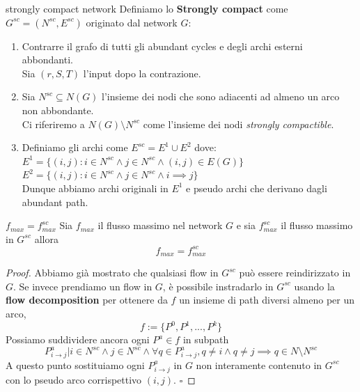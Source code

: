 \documentclass[a4paper, 11pt]{report}
\newcommand*{\QED}{\null\nobreak\hfill\ensuremath{\square}}%
\begin{document}
\begin{algo}{strongly compact network}{}
    Definiamo lo \textbf{Strongly compact} come $G^{sc} =(N^{sc}, E^{sc})$ originato dal network $G$:
    \begin{enumerate}
        \item Contrarre il grafo di tutti gli abundant cycles e degli archi esterni abbondanti.\\
        Sia $(r,S,T)$ l'input dopo la contrazione.
        \item Sia $N^{sc}\subseteq N(G)$ l'insieme dei nodi che sono adiacenti ad almeno un arco non abbondante.\\
        Ci riferiremo a $N(G)\setminus N^{sc}$ come l'insieme dei nodi \textit{strongly compactible}.
        \item Definiamo gli archi come $E^{sc} = E^1 \cup E^2$ dove:\\
        $E^1 = \{(i,j): i\in N^{sc}\land j\in N^{sc}\land (i,j)\in E(G)\}$\\
        $E^2 = \{(i,j): i\in N^{sc}\land j\in N^{sc}\land i\implies j\}$\\
        Dunque abbiamo archi originali in $E^1$ e pseudo archi che derivano dagli abundant path.
        
    \end{enumerate}
    
\end{algo}
   \begin{theo}[label = fmaxfsc]{$f_{max} = f_{max}^{sc}$}{}
    Sia $f_{max}$ il flusso massimo nel network $G$ e sia $f_{max}^{sc}$ il flusso massimo in $G^{sc}$ allora 
    \[f_{max} = f_{max}^{sc}\]
\end{theo}
\begin{proof}
    Abbiamo già mostrato che qualsiasi flow in $G^{sc}$ può essere reindirizzato in $G$.
    Se invece prendiamo un flow in $G$, è possibile instradarlo in $G^{sc}$ usando la \textbf{flow decomposition} per ottenere da $f$ un insieme di path diversi almeno per un arco,
    \[f := \{P^0, P^1, ..., P^k\}\]
    Possiamo suddividere ancora ogni $P^a\in f$ in subpath \[P^{a}_{i\rightarrow j}| i\in N^{sc}\land j\in N^{sc}\land \forall q \in P^a_{i\rightarrow j}, q\not = i \land q\not = j \implies q\in N\setminus N^{sc}\] 
    A questo punto sostituiamo ogni $P^{a}_{i\rightarrow j}$ in $G$ non  interamente contenuto in $G^{sc}$ con lo pseudo arco corrispettivo $(i,j)$.
    \QED
\end{proof}
\end{document}
